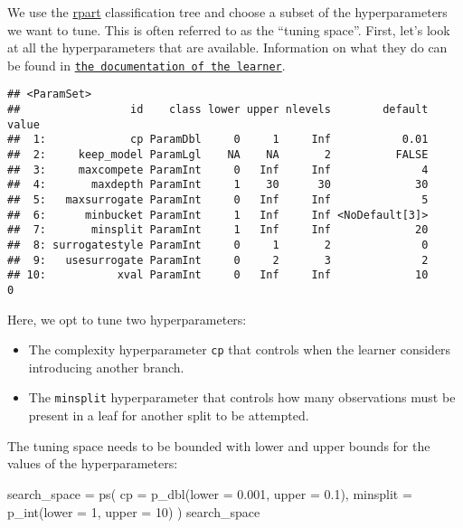 \documentclass[
]{scrbook}
\newenvironment{Shaded}{\begin{snugshade}}{\end{snugshade}}
\newcommand{\AttributeTok}[1]{\textcolor[rgb]{0.77,0.63,0.00}{#1}}
\newcommand{\DecValTok}[1]{\textcolor[rgb]{0.00,0.00,0.81}{#1}}
\newcommand{\FloatTok}[1]{\textcolor[rgb]{0.00,0.00,0.81}{#1}}
\newcommand{\FunctionTok}[1]{\textcolor[rgb]{0.00,0.00,0.00}{#1}}
\newcommand{\NormalTok}[1]{#1}
\newcommand{\OtherTok}[1]{\textcolor[rgb]{0.56,0.35,0.01}{#1}}
\newcommand{\SpecialCharTok}[1]{\textcolor[rgb]{0.00,0.00,0.00}{#1}}
\newcommand{\StringTok}[1]{\textcolor[rgb]{0.31,0.60,0.02}{#1}}
\providecommand{\tightlist}{%
  \setlength{\itemsep}{0pt}\setlength{\parskip}{0pt}}
\renewenvironment{Shaded} {\begin{snugshade}\small} {\end{snugshade}}
\begin{document}
We use the \href{https://cran.r-project.org/package=rpart}{rpart} classification tree and choose a subset of the hyperparameters we want to tune.
This is often referred to as the ``tuning space''.
First, let's look at all the hyperparameters that are available.
Information on what they do can be found in \href{https://www.rdocumentation.org/packages/rpart/topics/rpart.control}{\texttt{the\ documentation\ of\ the\ learner}}.

\begin{Shaded}
\end{Shaded}

\begin{verbatim}
## <ParamSet>
##                 id    class lower upper nlevels        default value
##  1:             cp ParamDbl     0     1     Inf           0.01      
##  2:     keep_model ParamLgl    NA    NA       2          FALSE      
##  3:     maxcompete ParamInt     0   Inf     Inf              4      
##  4:       maxdepth ParamInt     1    30      30             30      
##  5:   maxsurrogate ParamInt     0   Inf     Inf              5      
##  6:      minbucket ParamInt     1   Inf     Inf <NoDefault[3]>      
##  7:       minsplit ParamInt     1   Inf     Inf             20      
##  8: surrogatestyle ParamInt     0     1       2              0      
##  9:   usesurrogate ParamInt     0     2       3              2      
## 10:           xval ParamInt     0   Inf     Inf             10     0
\end{verbatim}

Here, we opt to tune two hyperparameters:

\begin{itemize}
\tightlist
\item
  The complexity hyperparameter \texttt{cp} that controls when the learner considers introducing another branch.
\item
  The \texttt{minsplit} hyperparameter that controls how many observations must be present in a leaf for another split to be attempted.
\end{itemize}

The tuning space needs to be bounded with lower and upper bounds for the values of the hyperparameters:

\begin{Shaded}
\begin{Highlighting}[]
\NormalTok{search\_space }\OtherTok{=} \FunctionTok{ps}\NormalTok{(}
  \AttributeTok{cp =} \FunctionTok{p\_dbl}\NormalTok{(}\AttributeTok{lower =} \FloatTok{0.001}\NormalTok{, }\AttributeTok{upper =} \FloatTok{0.1}\NormalTok{),}
  \AttributeTok{minsplit =} \FunctionTok{p\_int}\NormalTok{(}\AttributeTok{lower =} \DecValTok{1}\NormalTok{, }\AttributeTok{upper =} \DecValTok{10}\NormalTok{)}
\NormalTok{)}
\NormalTok{search\_space}
\end{Highlighting}
\end{Shaded}
\end{document}
